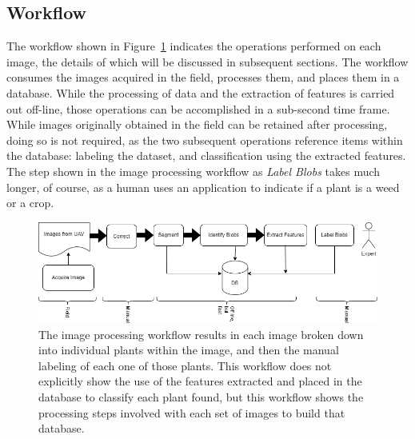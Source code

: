 \documentclass[12pt]{article}
\begin{document}
\subsection{Workflow}
The workflow shown in Figure~\ref{fig:workflow-image} indicates the operations performed on each image, the details of which will be discussed in subsequent sections.  The workflow consumes the images acquired in the field, processes them, and places them in a database.  While the processing of data and the extraction of features is carried out off-line, those operations can be accomplished in a sub-second time frame. While images originally obtained in the field can be retained after processing, doing so is not required, as the two subsequent operations reference items within the database: labeling the dataset, and classification using the extracted features. The step shown in the image processing workflow as \textit{Label Blobs} takes much longer, of course, as a human uses an application to indicate if a plant is a weed or a crop. 
\begin{figure}[h!]
	\centering
	\includegraphics[width=0.8\linewidth]{./figures/workflow.drawio.png}
	\caption[Image Workflow]{The image processing workflow results in each image broken down into individual plants within the image, and then the manual labeling of each one of those plants. This workflow does not explicitly show the use of the features extracted and placed in the database to classify each plant found, but this workflow shows the processing steps involved with each set of images to build that database.}
	\label{fig:workflow-image}
\end{figure}
\end{document}
